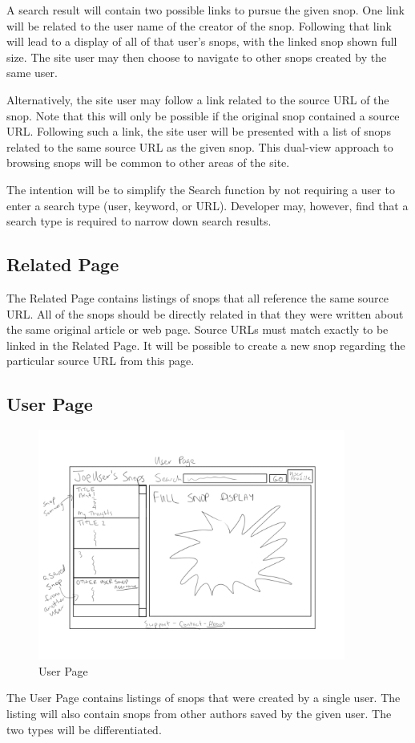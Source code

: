 \documentclass[11pt]{article}
\begin{document}
A search result will contain two possible links to pursue the given snop. One link will be related to the user name of the creator of the snop. Following that link will lead to a display of all of that user's snops, with the linked snop shown full size. The site user may then choose to navigate to other snops created by the same user.

Alternatively, the site user may follow a link related to the source URL of the snop. Note that this will only be possible if the original snop contained a source URL. Following such a link, the site user will be presented with a list of snops related to the same source URL as the given snop. This dual-view approach to browsing snops will be common to other areas of the site.

The intention will be to simplify the Search function by not requiring a user to enter a search type (user, keyword, or URL). Developer may, however, find that a search type is required to narrow down search results.
\subsection{Related Page}
\label{sec:related_page}
The Related Page contains listings of snops that all reference the same source URL. All of the snops should be directly related in that they were written about the same original article or web page. Source URLs must match exactly to be linked in the Related Page. It will be possible to create a new snop regarding the particular source URL from this page. 
\subsection{User Page}
\label{sec:user_page}
\begin{figure}[htb]
\begin{center}
\includegraphics[width=0.9\textwidth]{user_page.png}
\caption{User Page}
\label{fig:fig_user_page}
\end{center}
\end{figure}
The User Page contains listings of snops that were created by a single user. The listing will also contain snops from other authors saved by the given user. The two types will be differentiated. 
\end{document}
